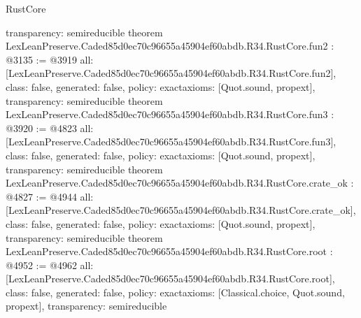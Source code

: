 \begin{lexlean}{RustCore}
\begin{coremodule}
{  transparency: semireducible
}
theorem LexLeanPreserve.Caded85d0ec70c96655a45904ef60abdb.R34.RustCore.fun2 : @3135 := @3919 {
  all: [LexLeanPreserve.Caded85d0ec70c96655a45904ef60abdb.R34.RustCore.fun2],
  class: false,
  generated: false,
  policy: exact{axioms: [Quot.sound, propext]},
  transparency: semireducible
}
theorem LexLeanPreserve.Caded85d0ec70c96655a45904ef60abdb.R34.RustCore.fun3 : @3920 := @4823 {
  all: [LexLeanPreserve.Caded85d0ec70c96655a45904ef60abdb.R34.RustCore.fun3],
  class: false,
  generated: false,
  policy: exact{axioms: [Quot.sound, propext]},
  transparency: semireducible
}
theorem LexLeanPreserve.Caded85d0ec70c96655a45904ef60abdb.R34.RustCore.crate_ok : @4827 := @4944 {
  all: [LexLeanPreserve.Caded85d0ec70c96655a45904ef60abdb.R34.RustCore.crate_ok],
  class: false,
  generated: false,
  policy: exact{axioms: [Quot.sound, propext]},
  transparency: semireducible
}
theorem LexLeanPreserve.Caded85d0ec70c96655a45904ef60abdb.R34.RustCore.root : @4952 := @4962 {
  all: [LexLeanPreserve.Caded85d0ec70c96655a45904ef60abdb.R34.RustCore.root],
  class: false,
  generated: false,
  policy: exact{axioms: [Classical.choice, Quot.sound, propext]},
  transparency: semireducible
}


\end{coremodule}
\end{lexlean}
